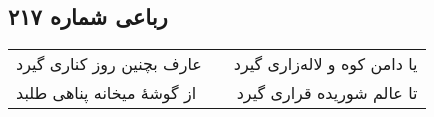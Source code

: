 \begin{center}
\section*{رباعی شماره ۲۱۷}
\label{sec:sh217}
\begin{longtable}{l p{0.5cm} r}
عارف بچنین روز کناری گیرد
&&
یا دامن کوه و لاله‌زاری گیرد
\\
از گوشهٔ میخانه پناهی طلبد
&&
تا عالم شوریده قراری گیرد
\\
\end{longtable}
\end{center}

